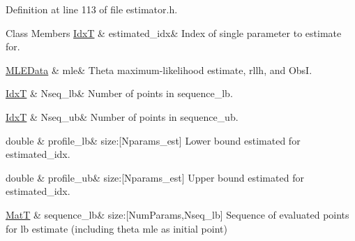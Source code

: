 Definition at line 113 of file estimator.\+h.

\begin{DoxyFields}{Class Members}
\hyperlink{namespacemappel_ab17ec0f30b61ece292439d7ece81d3a8}{IdxT}\hypertarget{namespacemappel_1_1estimator_aae656c5dcf7ceedd1a35dcb0163446c0}{}\label{namespacemappel_1_1estimator_aae656c5dcf7ceedd1a35dcb0163446c0}
&
estimated\+\_\+idx&
Index of single parameter to estimate for. \\
\hline

\hyperlink{namespacemappel_1_1estimator_structmappel_1_1estimator_1_1MLEData}{M\+L\+E\+Data}\hypertarget{namespacemappel_1_1estimator_a78f5375e6d29abb17573d1089af37b41}{}\label{namespacemappel_1_1estimator_a78f5375e6d29abb17573d1089af37b41}
&
mle&
Theta maximum-\/likelihood estimate, rllh, and ObsI. \\
\hline

\hyperlink{namespacemappel_ab17ec0f30b61ece292439d7ece81d3a8}{IdxT}\hypertarget{namespacemappel_1_1estimator_a6182fae879fca8e9b8b931215663c9b6}{}\label{namespacemappel_1_1estimator_a6182fae879fca8e9b8b931215663c9b6}
&
Nseq\+\_\+lb&
Number of points in sequence\+\_\+lb. \\
\hline

\hyperlink{namespacemappel_ab17ec0f30b61ece292439d7ece81d3a8}{IdxT}\hypertarget{namespacemappel_1_1estimator_a09d2bfc282a0586c3984a461959f9c21}{}\label{namespacemappel_1_1estimator_a09d2bfc282a0586c3984a461959f9c21}
&
Nseq\+\_\+ub&
Number of points in sequence\+\_\+ub. \\
\hline

double\hypertarget{namespacemappel_1_1estimator_aaa7b7e1fc33c0b4c8ae4cc841c8bb80c}{}\label{namespacemappel_1_1estimator_aaa7b7e1fc33c0b4c8ae4cc841c8bb80c}
&
profile\+\_\+lb&
size\+:\mbox{[}Nparams\+\_\+est\mbox{]} Lower bound estimated for estimated\+\_\+idx. \\
\hline

double\hypertarget{namespacemappel_1_1estimator_a8b5ba18fc88bfe59ee0ae0b77198fc5f}{}\label{namespacemappel_1_1estimator_a8b5ba18fc88bfe59ee0ae0b77198fc5f}
&
profile\+\_\+ub&
size\+:\mbox{[}Nparams\+\_\+est\mbox{]} Upper bound estimated for estimated\+\_\+idx. \\
\hline

\hyperlink{namespacemappel_a7091ab87c528041f7e2027195fad8915}{MatT}\hypertarget{namespacemappel_1_1estimator_a23115e11954d82b571430eb8e15281f2}{}\label{namespacemappel_1_1estimator_a23115e11954d82b571430eb8e15281f2}
&
sequence\+\_\+lb&
size\+:\mbox{[}Num\+Params,Nseq\+\_\+lb\mbox{]} Sequence of evaluated points for lb estimate (including theta mle as initial point) \\
\hline


\end{DoxyFields}
